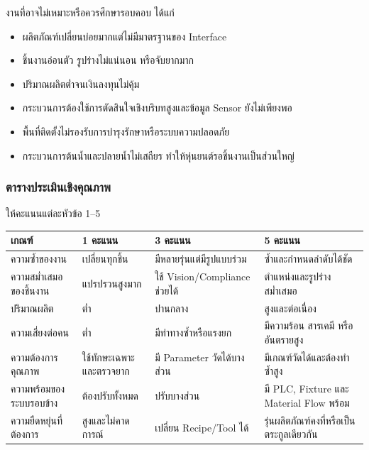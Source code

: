งานที่อาจไม่เหมาะหรือควรศึกษารอบคอบ ได้แก่

\begin{itemize}
    \item ผลิตภัณฑ์เปลี่ยนบ่อยมากแต่ไม่มีมาตรฐานของ Interface
    \item ชิ้นงานอ่อนตัว รูปร่างไม่แน่นอน หรือจับยากมาก
    \item ปริมาณผลิตต่ำจนเงินลงทุนไม่คุ้ม
    \item กระบวนการต้องใช้การตัดสินใจเชิงบริบทสูงและข้อมูล Sensor ยังไม่เพียงพอ
    \item พื้นที่ติดตั้งไม่รองรับการบำรุงรักษาหรือระบบความปลอดภัย
    \item กระบวนการต้นน้ำและปลายน้ำไม่เสถียร ทำให้หุ่นยนต์รอชิ้นงานเป็นส่วนใหญ่
\end{itemize}

\subsubsection{ตารางประเมินเชิงคุณภาพ}

ให้คะแนนแต่ละหัวข้อ 1–5

\begin{table}[htbp]
    \centering
    \small
    \begin{tabularx}{\textwidth}{L{0.24\textwidth} Y Y Y}
        \hline
        \textbf{เกณฑ์} & \textbf{1 คะแนน} & \textbf{3 คะแนน} & \textbf{5 คะแนน} \\
        \hline
        ความซ้ำของงาน & เปลี่ยนทุกชิ้น & มีหลายรุ่นแต่มีรูปแบบร่วม & ซ้ำและกำหนดลำดับได้ชัด \\
        ความสม่ำเสมอของชิ้นงาน & แปรปรวนสูงมาก & ใช้ Vision/Compliance ช่วยได้ & ตำแหน่งและรูปร่างสม่ำเสมอ \\
        ปริมาณผลิต & ต่ำ & ปานกลาง & สูงและต่อเนื่อง \\
        ความเสี่ยงต่อคน & ต่ำ & มีท่าทางซ้ำหรือแรงยก & มีความร้อน สารเคมี หรืออันตรายสูง \\
        ความต้องการคุณภาพ & ใช้ทักษะเฉพาะและตรวจยาก & มี Parameter วัดได้บางส่วน & มีเกณฑ์วัดได้และต้องทำซ้ำสูง \\
        ความพร้อมของระบบรอบข้าง & ต้องปรับทั้งหมด & ปรับบางส่วน & มี PLC, Fixture และ Material Flow พร้อม \\
        ความยืดหยุ่นที่ต้องการ & สูงและไม่คาดการณ์ & เปลี่ยน Recipe/Tool ได้ & รุ่นผลิตภัณฑ์คงที่หรือเป็นตระกูลเดียวกัน \\
        \hline
    \end{tabularx}
\end{table}

